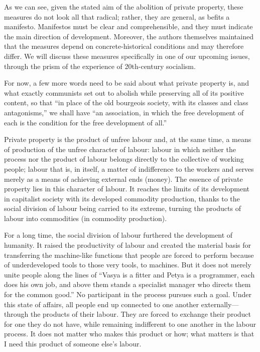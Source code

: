 \documentclass[12pt,a4paper,openany]{book}
\begin{document}
As we can see, given the stated aim of the abolition of private property, these measures do not look all that radical; rather, they are general, as befits a manifesto. Manifestos must be clear and comprehensible, and they must indicate the main direction of development. Moreover, the authors themselves maintained that the measures depend on concrete-historical conditions and may therefore differ. We will discuss these measures specifically in one of our upcoming issues, through the prism of the experience of 20th-century socialism.

For now, a few more words need to be said about what private property is, and what exactly communists set out to abolish while preserving all of its positive content, so that “in place of the old bourgeois society, with its classes and class antagonisms,” we shall have “an association, in which the free development of each is the condition for the free development of all.”

Private property is the product of unfree labour and, at the same time, a means of production of the unfree character of labour: labour in which neither the process nor the product of labour belongs directly to the collective of working people; labour that is, in itself, a matter of indifference to the workers and serves merely as a means of achieving external ends (money). The essence of private property lies in this character of labour. It reaches the limits of its development in capitalist society with its developed commodity production, thanks to the social division of labour being carried to its extreme, turning the products of labour into commodities (in commodity production).

For a long time, the social division of labour furthered the development of humanity. It raised the productivity of labour and created the material basis for transferring the machine-like functions that people are forced to perform because of underdeveloped tools to those very tools, to machines. But it does not merely unite people along the lines of “Vasya is a fitter and Petya is a programmer, each does his own job, and above them stands a specialist manager who directs them for the common good.” No participant in the process pursues such a goal. Under this state of affairs, all people end up connected to one another externally—through the products of their labour. They are forced to exchange their product for one they do not have, while remaining indifferent to one another in the labour process. It does not matter who makes this product or how; what matters is that I need this product of someone else’s labour.
\end{document}
